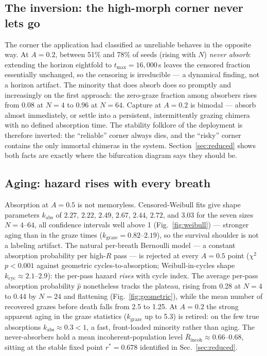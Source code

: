 \documentclass[11pt]{article}
\begin{document}
\subsection{The inversion: the high-morph corner never lets go}

The corner the application had classified as unreliable behaves in the opposite way.
At $A = 0.2$, between 51\% and 78\% of seeds (rising with $N$) \emph{never absorb}:
extending the horizon eightfold to $t_{\max} = 16{,}000$\,s leaves the censored
fraction essentially unchanged, so the censoring is irreducible --- a dynamical
finding, not a horizon artifact. The minority that does absorb does so promptly and
increasingly on the first approach: the zero-graze fraction among absorbers rises
from 0.08 at $N = 4$ to 0.96 at $N = 64$. Capture at $A = 0.2$ is bimodal ---
absorb almost immediately, or settle into a persistent, intermittently grazing
chimera~\cite{sudaokuda2015} with no defined absorption time. The stability folklore of the deployment is
therefore inverted: the ``reliable'' corner always dies, and the ``risky'' corner
contains the only immortal chimeras in the system. Section~\ref{sec:reduced} shows
both facts are exactly where the bifurcation diagram says they should be.

\subsection{Aging: hazard rises with every breath}

Absorption at $A = 0.5$ is not memoryless. Censored-Weibull fits give shape
parameters $k_{\mathrm{abs}}$ of $2.27$, $2.22$, $2.49$, $2.67$, $2.44$, $2.72$, and
$3.03$ for the seven sizes $N = 4$--$64$, all confidence intervals well above 1 (Fig.~\ref{fig:weibull}) ---
stronger aging than in the graze times ($k_{\mathrm{graze}} = 0.82$--$2.19$), so the
survival shoulder is not a labeling artifact. The natural per-breath Bernoulli model
--- a constant absorption probability per high-$R$ pass --- is rejected at every
$A = 0.5$ point ($\chi^2$ $p < 0.001$ against geometric cycles-to-absorption;
Weibull-in-cycles shape $k_{\mathrm{cyc}} \approx 2.1$--$2.9$): the per-pass hazard
\emph{rises} with cycle index. The average per-pass absorption probability
$\hat p$ nonetheless tracks the plateau, rising from 0.28 at $N = 4$ to 0.44 by
$N = 24$ and flattening (Fig.~\ref{fig:geometric}), while the mean number of
recovered grazes before death falls from 2.5 to 1.25. At $A = 0.2$ the strong
apparent aging in the graze statistics ($k_{\mathrm{graze}}$ up to 5.3) is retired:
on the few true absorptions $k_{\mathrm{abs}} \approx 0.3 < 1$, a fast, front-loaded
minority rather than aging. The never-absorbers hold a mean incoherent-population
level $\overline{R}_{\mathrm{incoh}} \approx 0.66$--$0.68$, sitting at the stable
fixed point $r^* = 0.678$ identified in Sec.~\ref{sec:reduced}.
\end{document}
